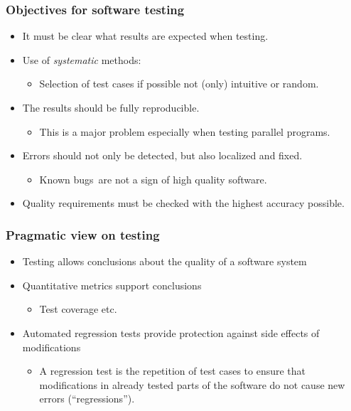 \begin{frame}
\frametitle{Objectives for software testing}
\begin{itemize}
  \item It must be clear what results are expected when testing.
  \item Use of \emph{systematic} methods:
    \begin{itemize}
      \item Selection of test cases if possible not (only) intuitive or random.
    \end{itemize}
  \item The results should be fully reproducible. 
    \begin{itemize}
      \item This is a major problem especially when testing parallel programs.
    \end{itemize}
  \item Errors should not only be detected, but also localized and fixed. %
    \begin{itemize}
      \item \glq Known bugs\grq\ are not a sign of high quality software.
    \end{itemize}       
  \item Quality requirements must be checked with the highest accuracy possible.
\end{itemize}
\end{frame}


\begin{frame}
\frametitle{Pragmatic view on testing}
\begin{itemize}
    \item Testing allows conclusions about the quality of a software system 
    \item Quantitative metrics support conclusions 
         \begin{itemize}\item Test coverage etc. 
         \end{itemize} 
    \item Automated regression tests provide protection against side effects of modifications 
		\begin{itemize}
			\item A regression test is the repetition of test cases to ensure that modifications in already tested parts of the software do not cause new errors (``regressions''). 
		\end{itemize}
\end{itemize}
\end{frame}

